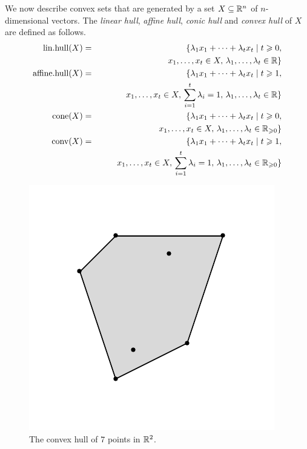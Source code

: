 We now describe convex sets that are generated by a set 
 $X\subseteq\mathbb{R}^n$  of $n$-dimensional
vectors. The \emph{linear hull}, \emph{affine hull}, \emph{conic hull} and \emph{convex
  hull} of $X$ are defined as follows.
\begin{eqnarray}
  \mathrm{lin.hull}(X) & = & \{ \lambda_1 x_1+ \cdots + \lambda_t x_t \mid t\geqslant0,  \label{conv:eq:2}\\
   & & \quad \quad  x_1,\ldots,x_t
  \in  X, \, \lambda_1,\ldots,\lambda_t\in \mathbb{R}\} \nonumber \\
  \mathrm{affine.hull}(X) & = & \{ \lambda_1 x_1+ \cdots + \lambda_t x_t \mid t\geqslant1, \label{conv:eq:4}\\
  & &   \quad \quad  x_1,\ldots,x_t \in  X, \, \sum_{i=1}^t \lambda_i = 1, \,
  \lambda_1,\ldots,\lambda_t\in \mathbb{R}\} \nonumber   \\ 
  \mathrm{cone}(X)  & = & \{ \lambda_1 x_1+ \cdots + \lambda_t x_t \mid t\geqslant0, \label{conv:eq:5} \\
  &&     \quad \quad  x_1,\ldots,x_t \in  X,  \, \lambda_1,\ldots,\lambda_t\in
  \mathbb{R}_{\geqslant0}\} \nonumber \\
  \operatorname{conv}(X) & = & \{ \lambda_1 x_1+ \cdots + \lambda_t x_t \mid t\geqslant1, \label{conv:eq:6} \\
  &&     \quad \quad  x_1,\ldots,x_t \in  X, \,  \sum_{i=1}^t \lambda_i = 1, \, \lambda_1,\ldots,\lambda_t\in
  \mathbb{R}_{\geqslant0}\} \nonumber 
\end{eqnarray}



\begin{figure}[htbp]
  \begin{center}
    \includegraphics{figures/picture1.pdf}    
  \end{center}
  \caption{The convex hull of $7$ points in $\mathbb{R}^2$. }\label{conv:fig:2}
\end{figure}


